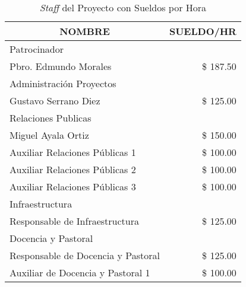 \begin{table}
    \centering
    \caption{\emph{Staff} del Proyecto con Sueldos por Hora}
    \label{tbl:Proy:Personal:Costos}
    \footnotesize
    \begin{tabular}{l|r}
        \multicolumn{1}{c|}{NOMBRE}                     & \multicolumn{1}{c}{SUELDO/HR} \\
        \hline
        \hline
        \multicolumn{2}{l}{Patrocinador}                                                \\
        \hline
        \hspace{1em} Pbro. Edmundo Morales              & \$ 187.50                     \\
        \hline
        \multicolumn{2}{l}{Administración Proyectos}                                    \\
        \hline
        \hspace{1em} Gustavo Serrano Diez               & \$ 125.00                     \\
        \hline
        \multicolumn{2}{l}{Relaciones Publicas}                                         \\
        \hline
        \hspace{1em} Miguel Ayala Ortiz                 & \$ 150.00                     \\
        \hspace{1em} Auxiliar Relaciones Públicas 1     & \$ 100.00                     \\
        \hspace{1em} Auxiliar Relaciones Públicas 2     & \$ 100.00                     \\
        \hspace{1em} Auxiliar Relaciones Públicas 3     & \$ 100.00                     \\
        \hline
        \multicolumn{2}{l}{Infraestructura}                                             \\
        \hline
        \hspace{1em} Responsable de Infraestructura     & \$ 125.00                     \\
        \hline
        \multicolumn{2}{l}{Docencia y Pastoral}                                         \\
        \hline
        \hspace{1em} Responsable de Docencia y Pastoral & \$ 125.00                     \\
        \hspace{1em} Auxiliar de Docencia y Pastoral 1  & \$ 100.00                     \\

\end{tabular}
\end{table}
